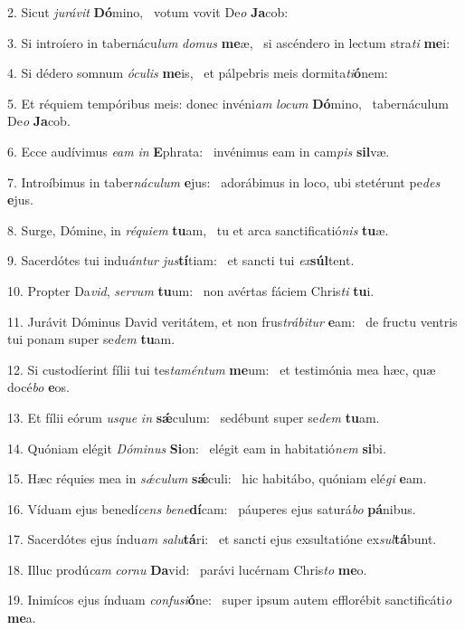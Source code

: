 2. Sicut \textit{ju}\textit{rá}\textit{vit} \textbf{Dó}mino, \ast\  votum vovit De\textit{o} \textbf{Ja}cob:\

3. Si introíero in tabernácu\textit{lum} \textit{do}\textit{mus} \textbf{me}æ, \ast\  si ascéndero in lectum stra\textit{ti} \textbf{me}i:\

4. Si dédero somnum \textit{ó}\textit{cu}\textit{lis} \textbf{me}is, \ast\  et pálpebris meis dormita\textit{ti}\textbf{ó}nem:\

5. Et réquiem tempóribus meis: donec invéni\textit{am} \textit{lo}\textit{cum} \textbf{Dó}mino, \ast\  tabernáculum De\textit{o} \textbf{Ja}cob.\

6. Ecce audívimus \textit{e}\textit{am} \textit{in} \textbf{E}phrata: \ast\  invénimus eam in cam\textit{pis} \textbf{sil}væ.\

7. Introíbimus in taber\textit{ná}\textit{cu}\textit{lum} \textbf{e}jus: \ast\  adorábimus in loco, ubi stetérunt pe\textit{des} \textbf{e}jus.\

8. Surge, Dómine, in \textit{ré}\textit{qui}\textit{em} \textbf{tu}am, \ast\  tu et arca sanctificatió\textit{nis} \textbf{tu}æ.\

9. Sacerdótes tui indu\textit{án}\textit{tur} \textit{jus}\textbf{tí}tiam: \ast\  et sancti tui \textit{ex}\textbf{súl}tent.\

10. Propter Da\textit{vid}, \textit{ser}\textit{vum} \textbf{tu}um: \ast\  non avértas fáciem Chris\textit{ti} \textbf{tu}i.\

11. Jurávit Dóminus David veritátem, et non frus\textit{trá}\textit{bi}\textit{tur} \textbf{e}am: \ast\  de fructu ventris tui ponam super se\textit{dem} \textbf{tu}am.\

12. Si custodíerint fílii tui tes\textit{ta}\textit{mén}\textit{tum} \textbf{me}um: \ast\  et testimónia mea hæc, quæ docé\textit{bo} \textbf{e}os.\

13. Et fílii eórum \textit{us}\textit{que} \textit{in} \textbf{sǽ}culum: \ast\  sedébunt super se\textit{dem} \textbf{tu}am.\

14. Quóniam elégit \textit{Dó}\textit{mi}\textit{nus} \textbf{Si}on: \ast\  elégit eam in habitatió\textit{nem} \textbf{si}bi.\

15. Hæc réquies mea in \textit{sǽ}\textit{cu}\textit{lum} \textbf{sǽ}culi: \ast\  hic habitábo, quóniam elé\textit{gi} \textbf{e}am.\

16. Víduam ejus benedí\textit{cens} \textit{be}\textit{ne}\textbf{dí}cam: \ast\  páuperes ejus saturá\textit{bo} \textbf{pá}nibus.\

17. Sacerdótes ejus índu\textit{am} \textit{sa}\textit{lu}\textbf{tá}ri: \ast\  et sancti ejus exsultatióne ex\textit{sul}\textbf{tá}bunt.\

18. Illuc prodú\textit{cam} \textit{cor}\textit{nu} \textbf{Da}vid: \ast\  parávi lucérnam Chris\textit{to} \textbf{me}o.\

19. Inimícos ejus índuam \textit{con}\textit{fu}\textit{si}\textbf{ó}ne: \ast\  super ipsum autem efflorébit sanctificáti\textit{o} \textbf{me}a.\

